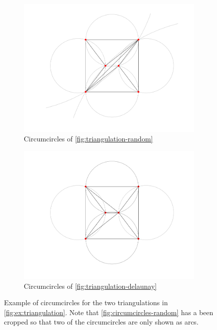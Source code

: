 \begin{figure}[ht]
    \centering
    \begin{subfigure}[b]{0.4\textwidth}
        \centering
        \includegraphics[width=\textwidth]{report/Images/Theory/circumcircles/circumcircle_random.png}
        \caption{Circumcircles of \autoref{fig:triangulation-random}}
        \label{fig:circumcircles-random}
    \end{subfigure}
    \begin{subfigure}[b]{0.4\textwidth}
        \centering
        \includegraphics[width=\textwidth]{report/Images/Theory/circumcircles/circumcircle_delaunay.png}
        \caption{Circumcircles of \autoref{fig:triangulation-delaunay}}
        \label{fig:circumcircles-delaunay}
    \end{subfigure}
    \caption[Example of circumcircles]{Example of circumcircles for the two triangulations in \autoref{fig:ex:triangulation}. Note that \autoref{fig:circumcircles-random} has a been cropped so that two of the circumcircles are only shown as arcs.}
    \label{fig:ex:circumcircles}
\end{figure}


